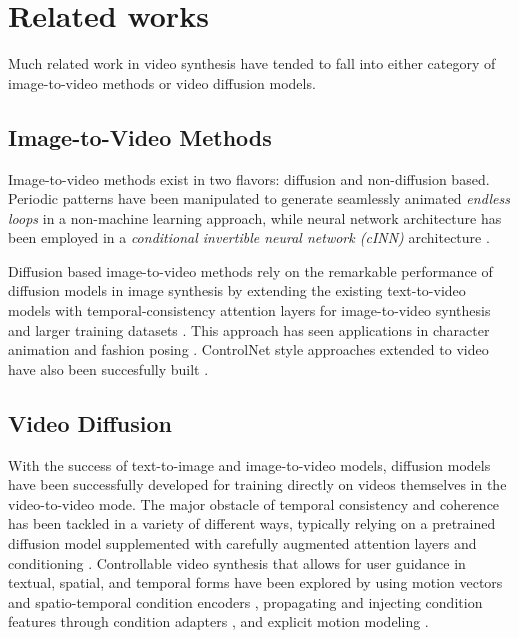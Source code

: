 \section{Related works}
\label{sec:related_work}

Much related work in video synthesis have tended to fall into either category of image-to-video methods or video diffusion models.

\subsection{Image-to-Video Methods}

Image-to-video methods exist in two flavors: diffusion and non-diffusion based. Periodic patterns have been manipulated to generate seamlessly animated \emph{endless loops} \cite{Halperin_2021} in a non-machine learning approach, while neural network architecture has been employed in a \emph{conditional invertible neural network (cINN)} architecture \cite{dorkenwald2021stochasticimagetovideosynthesisusing}. 

Diffusion based image-to-video methods rely on the remarkable performance of diffusion models in image synthesis by extending the existing text-to-video models with temporal-consistency attention layers for image-to-video synthesis and larger training datasets \cite{blattmann2023stablevideodiffusionscaling}. This approach has seen applications in character animation \cite{hu2024animateanyoneconsistentcontrollable} and fashion posing \cite{52750}. ControlNet \cite{zhang2023addingconditionalcontroltexttoimage} style approaches extended to video have also been succesfully built \cite{zhang2023controlvideotrainingfreecontrollabletexttovideo}.


\subsection{Video Diffusion}

With the success of text-to-image and image-to-video models, diffusion models have been successfully developed for training directly on videos themselves in the video-to-video mode. The major obstacle of temporal consistency and coherence has been tackled in a variety of different ways, typically relying on a pretrained diffusion model supplemented with carefully augmented attention layers and conditioning \cite{melnik2024videodiffusionmodelssurvey}. Controllable video synthesis that allows for user guidance in textual, spatial, and temporal forms have been explored by using motion vectors and spatio-temporal condition encoders \cite{wang2023videocomposercompositionalvideosynthesis}, propagating and injecting condition features through condition adapters \cite{wang2024easycontroltransfercontrolnetvideo}, and explicit motion modeling \cite{shi2024motioni2vconsistentcontrollableimagetovideo}.

